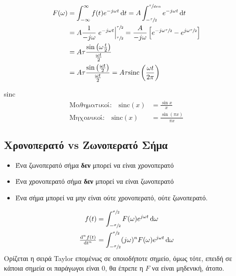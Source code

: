\documentclass[11pt,a4paper,titlepage,fleqn]{article}
\begin{document}
     \paragraph{}
     \begin{align*}
     F(\omega ) &= \int_{-\infty}^{\infty} f(t)e^{-j\omega t}\dif t
     = A \int_{-\sfrac{\tau}{2} }^{\sfrac{\tau}{den} }e^{-j\omega t}\dif t
     \\ &= A\frac{1}{-j\omega }
     \left. e^{-j\omega t}\right|_{\sfrac{\tau}{2}}^{\sfrac{\tau}{2}}
     =\frac{A}{-j\omega }\left[ e^{-j\omega \sfrac{\tau}{2} } 
     -e^{j\omega \sfrac{\tau}{2}}
     \right] \\ &= A\tau\frac{\sin\left(\omega\frac{t}{2}\right)}{\frac{\omega t}{2}}
     \\ &= A\tau\frac{\sin\left(\frac{\omega t}{2}\right)}{\frac{\omega t}{2}}
     =A\tau \mathrm{sinc}\left(\frac{\omega t}{2\pi}\right)
     \end{align*}
     \begin{infobox}{sinc}
     	\vspace{-5pt}
     	\begin{align*}
     	\text{Μαθηματικοί:}\quad \mathrm{sinc}(x)&=\frac{\sin x}{x}\\
     	\text{Μηχανικοί:}\quad \mathrm{sinc}(x)&=\frac{\sin(\pi x)}{\pi x}
     	\end{align*}
     \end{infobox}
     
     \subsection{Χρονοπερατό vs Ζωνοπερατό Σήμα}
     \begin{itemize}
     	\item Ένα ζωνοπερατό σήμα \textbf{δεν} μπορεί να είναι χρονοπερατό
     	\item Ένα χρονοπερατό σήμα \textbf{δεν} μπορεί να είναι ζωνοπερατό
     	\item Ένα σήμα μπορεί να μην είναι ούτε χρονοπερατό, ούτε ζωνοπερατό.
     \end{itemize}
     
     
     \begin{align*}
     f(t) &= \int_{-\sfrac{\sigma}{2} }^{\sfrac{\sigma}{2} } F(\omega )
     e^{j\omega t}\dif\omega \\
     \od[n]{f(t)}{t} &= \int_{-\sfrac{\sigma}{2} }^{\sfrac{\sigma}{2} }
     (j\omega )^n F(\omega )e^{j\omega t}\dif\omega
     \end{align*}
     Ορίζεται η σειρά Taylor επομένως σε οποιοδήποτε σημείο, όμως τότε, επειδή
     σε κάποια σημεία οι παράγωγοι είναι 0, θα έπρεπε η \( F \) να είναι
     μηδενική, άτοπο.
     
\end{document}
